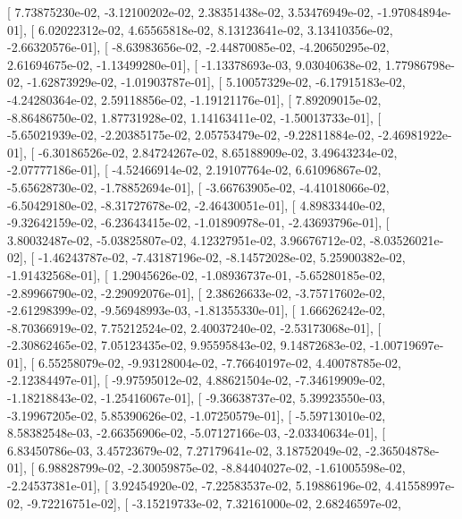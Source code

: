 \documentclass{article}
\begin{document}
       [  7.73875230e-02,  -3.12100202e-02,   2.38351438e-02,
          3.53476949e-02,  -1.97084894e-01],
       [  6.02022312e-02,   4.65565818e-02,   8.13123641e-02,
          3.13410356e-02,  -2.66320576e-01],
       [ -8.63983656e-02,  -2.44870085e-02,  -4.20650295e-02,
          2.61694675e-02,  -1.13499280e-01],
       [ -1.13378693e-03,   9.03040638e-02,   1.77986798e-02,
         -1.62873929e-02,  -1.01903787e-01],
       [  5.10057329e-02,  -6.17915183e-02,  -4.24280364e-02,
          2.59118856e-02,  -1.19121176e-01],
       [  7.89209015e-02,  -8.86486750e-02,   1.87731928e-02,
          1.14163411e-02,  -1.50013733e-01],
       [ -5.65021939e-02,  -2.20385175e-02,   2.05753479e-02,
         -9.22811884e-02,  -2.46981922e-01],
       [ -6.30186526e-02,   2.84724267e-02,   8.65188909e-02,
          3.49643234e-02,  -2.07777186e-01],
       [ -4.52466914e-02,   2.19107764e-02,   6.61096867e-02,
         -5.65628730e-02,  -1.78852694e-01],
       [ -3.66763905e-02,  -4.41018066e-02,  -6.50429180e-02,
         -8.31727678e-02,  -2.46430051e-01],
       [  4.89833440e-02,  -9.32642159e-02,  -6.23643415e-02,
         -1.01890978e-01,  -2.43693796e-01],
       [  3.80032487e-02,  -5.03825807e-02,   4.12327951e-02,
          3.96676712e-02,  -8.03526021e-02],
       [ -1.46243787e-02,  -7.43187196e-02,  -8.14572028e-02,
          5.25900382e-02,  -1.91432568e-01],
       [  1.29045626e-02,  -1.08936737e-01,  -5.65280185e-02,
         -2.89966790e-02,  -2.29092076e-01],
       [  2.38626633e-02,  -3.75717602e-02,  -2.61298399e-02,
         -9.56948993e-03,  -1.81355330e-01],
       [  1.66626242e-02,  -8.70366919e-02,   7.75212524e-02,
          2.40037240e-02,  -2.53173068e-01],
       [ -2.30862465e-02,   7.05123435e-02,   9.95595843e-02,
          9.14872683e-02,  -1.00719697e-01],
       [  6.55258079e-02,  -9.93128004e-02,  -7.76640197e-02,
          4.40078785e-02,  -2.12384497e-01],
       [ -9.97595012e-02,   4.88621504e-02,  -7.34619909e-02,
         -1.18218843e-02,  -1.25416067e-01],
       [ -9.36638737e-02,   5.39923550e-03,  -3.19967205e-02,
          5.85390626e-02,  -1.07250579e-01],
       [ -5.59713010e-02,   8.58382548e-03,  -2.66356906e-02,
         -5.07127166e-03,  -2.03340634e-01],
       [  6.83450786e-03,   3.45723679e-02,   7.27179641e-02,
          3.18752049e-02,  -2.36504878e-01],
       [  6.98828799e-02,  -2.30059875e-02,  -8.84404027e-02,
         -1.61005598e-02,  -2.24537381e-01],
       [  3.92454920e-02,  -7.22583537e-02,   5.19886196e-02,
          4.41558997e-02,  -9.72216751e-02],
       [ -3.15219733e-02,   7.32161000e-02,   2.68246597e-02,
\end{document}
